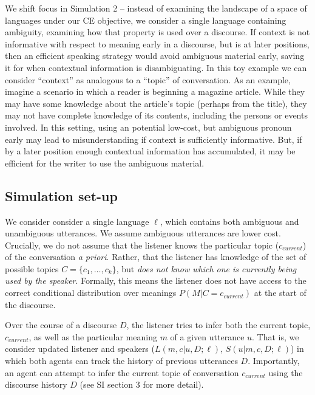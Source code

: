 \documentclass[10pt, letterpaper]{article}
\begin{document}
We shift focus in Simulation 2 -- instead of examining the landscape of
a space of languages under our CE objective, we consider a single
language containing ambiguity, examining how that property is used over
a discourse. If context is not informative with respect to meaning early
in a discourse, but is at later positions, then an efficient speaking
strategy would avoid ambiguous material early, saving it for when
contextual information is disambiguating. In this toy example we can
consider ``context'' as analogous to a ``topic'' of conversation. As an
example, imagine a scenario in which a reader is beginning a magazine
article. While they may have some knowledge about the article's topic
(perhaps from the title), they may not have complete knowledge of its
contents, including the persons or events involved. In this setting,
using an potential low-cost, but ambiguous pronoun early may lead to
misunderstanding if context is sufficiently informative. But, if by a
later position enough contextual information has accumulated, it may be
efficient for the writer to use the ambiguous material.\par

\subsection{Simulation set-up}\label{simulation-set-up-1}

We consider consider a single language \(\ell\), which contains both
ambiguous and unambiguous utterances. We assume ambiguous utterances are
lower cost. Crucially, we do not assume that the listener knows the
particular topic (\(c_{current}\)) of the conversation
\textit{a priori}. Rather, that the listener has knowledge of the set of
possible topics \(C = \{c_1, \dots, c_k\}\), but
\textit{does not know which one is currently being used by the speaker}.
Formally, this means the listener does not have access to the correct
conditional distribution over meanings \(P(M|C=c_{current})\) at the
start of the discourse.\par 

Over the course of a discourse \(D\), the listener tries to infer both
the current topic, \(c_{current}\), as well as the particular meaning
\(m\) of a given utterance \(u\). That is, we consider updated listener
and speakers (\(L(m, c|u,D;\ell)\), \(S(u|m,c,D;\ell)\)) in which both
agents can track the history of previous utterances \(D\). Importantly,
an agent can attempt to infer the current topic of conversation
\(c_{current}\) using the discourse history \(D\) (see SI section 3 for
more detail).\par
\end{document}
